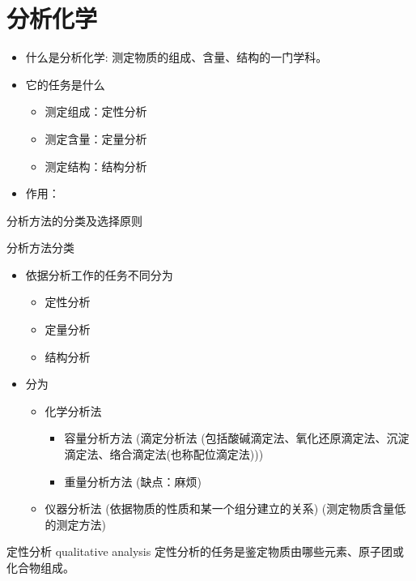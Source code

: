\section{分析化学}

\begin{itemize}
	\item 什么是分析化学: 测定物质的组成、含量、结构的一门学科。
	\item 它的任务是什么

	\begin{itemize}
		\item 测定组成：定性分析
		\item 测定含量：定量分析
		\item 测定结构：结构分析	
	\end{itemize}

	\item 作用： 
	
\end{itemize}

分析方法的分类及选择原则

分析方法分类
\begin{itemize}
	\item 依据分析工作的任务不同分为
	\begin{itemize}
		\item 定性分析
		\item 定量分析
		\item 结构分析
	\end{itemize}
		
	\item 分为
	\begin{itemize}
		\item 化学分析法
		\begin{itemize}
			\item 容量分析方法 (滴定分析法 (包括酸碱滴定法、氧化还原滴定法、沉淀滴定法、络合滴定法(也称配位滴定法))) 
			\item 重量分析方法 (缺点：麻烦)
				
		\end{itemize}
		\item 仪器分析法 (依据物质的性质和某一个组分建立的关系) (测定物质含量低的测定方法)

	\end{itemize}
\end{itemize}

\begin{definition}{定性分析 qualitative analysis}
	定性分析的任务是鉴定物质由哪些元素、原子团或化合物组成。
	
\end{definition}


